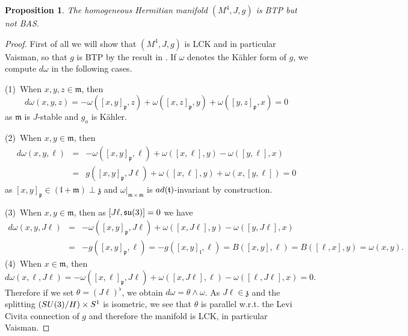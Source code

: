 \documentclass{amsart}
\numberwithin{equation}{section}
\newtheorem{proposition}[theorem]{Proposition}
\theoremstyle{definition}
\renewcommand{\1}{\mathds{1}}
\newcommand{\gz}{\mathfrak z}
\newcommand{\gp}{\mathfrak p}
\newcommand{\gl}{\mathfrak l}
\newcommand{\gm}{\mathfrak m}
\newcommand{\gt}{\mathfrak t}
\newcommand{\SU}{\rm {SU}}
\renewcommand{\>}{\rightarrow}
\begin{document}
\begin{proposition} The homogeneous Hermitian manifold $(M^4,J,g)$ is {\rm BTP} but not {\rm BAS}.
\end{proposition}
\begin{proof} First of all we will show that $(M^4,J,g)$ is LCK and in particular Vaisman, so that $g$ is {\rm BTP} by the result in \cite{AV}.
If $\omega$ denotes the K\"ahler form of $g$, we compute $d\omega$ in the following cases.

(1)\ When $x,y,z\in\gm$, then
$$d\omega(x,y,z)= -\omega([x,y]_\gp,z) + \omega([x,z]_\gp,y) + \omega([y,z]_\gp,x) = 0$$
as $\gm$ is $J$-stable and $g_o$ is K\"ahler.

(2)\ When $x,y\in\gm$, then
\begin{eqnarray*}d\omega(x,y,\ell) &=& -\omega([x,y]_\gp,\ell)+ \omega([x,\ell],y) -\omega([y,\ell],x)\\
&=& g([x,y]_\gp,J\ell) + \omega([x,\ell],y) +\omega(x,[y,\ell])=0
\end{eqnarray*}
as $[x,y]_\gp\in (\gl+\gm) \perp \gz$ and $\omega|_{\gm\times\gm}$ is $\rm{ad}(\gt)$-invariant by construction.

(3)\ When $x,y\in \gm$, then as $[J\ell,\frak{su}(3)]=0$ we have
\begin{eqnarray*}d\omega(x,y,J\ell) &=& -\omega([x,y]_\gp,J\ell)+ \omega([x,J\ell],y) -\omega([y,J\ell],x)\\
&=& -g([x,y]_\gp,\ell) = -g([x,y]_\gl,\ell) = B([x,y],\ell) = B([\ell,x],y) = \omega(x,y).
\end{eqnarray*}
(4)\ When $x\in\gm$, then
$$d\omega(x,\ell,J\ell) = -\omega([x,\ell]_\gp,J\ell)+ \omega([x,J\ell],\ell) -\omega([\ell,J\ell],x) = 0.$$
Therefore if we set $\theta = (J\ell)^\flat$, we obtain $d\omega=\theta\wedge\omega$.  As $J\ell\in\gz$ and the splitting $(\SU(3)/\rm H) \times S^1$ is isometric, we see that $\theta$ is parallel w.r.t. the Levi Civita connection of $g$ and therefore the manifold is LCK, in particular Vaisman.



\end{proof}
\end{document}
